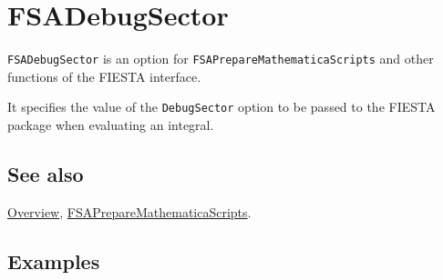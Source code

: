 \documentclass[../FeynHelpersManual.tex]{subfiles}
\begin{document}
\hypertarget{fsadebugsector}{
\section{FSADebugSector}\label{fsadebugsector}}

\texttt{FSADebugSector} is an option for
\texttt{FSAPrepareMathematicaScripts} and other functions of the FIESTA
interface.

It specifies the value of the \texttt{DebugSector} option to be passed
to the FIESTA package when evaluating an integral.

\subsection{See also}

\hyperlink{toc}{Overview},
\hyperlink{fsapreparemathematicascripts}{FSAPrepareMathematicaScripts}.

\subsection{Examples}
\end{document}

